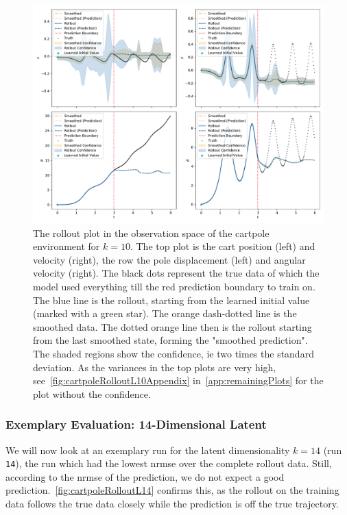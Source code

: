 			\begin{figure}
				\centering
				\includegraphics[width=\linewidth]{figures/results/cartpole-gym/run-latent-dim-10/rollout-observations-N0.pdf}
				\caption{The rollout plot in the observation space of the cartpole environment for \(k = 10\). The top plot is the cart position (left) and velocity (right), the row the pole displacement (left) and angular velocity (right). The black dots represent the true data of which the model used everything till the red prediction boundary to train on. The blue line is the rollout, starting from the learned initial value (marked with a green star). The orange dash-dotted line is the smoothed data. The dotted orange line then is the rollout starting from the last smoothed state, forming the "smoothed prediction". The shaded regions show the confidence, \ac{ie} two times the standard deviation. As the variances in the top plots are very high, see~\autoref{fig:cartpoleRolloutL10Appendix} in~\autoref{app:remainingPlots} for the plot without the confidence.}
				\label{fig:cartpoleRolloutL10}
			\end{figure}

		\subsubsection{Exemplary Evaluation: 14-Dimensional Latent}
			We will now look at an exemplary run for the latent dimensionality \( k = 14 \) (run \texttt{14}), the run which had the lowest \ac{nrmse} over the complete rollout data. Still, according to the \ac{nrmse} of the prediction, we do not expect a good prediction.~\autoref{fig:cartpoleRolloutL14} confirms this, as the rollout on the training data follows the true data closely while the prediction is off the true trajectory.

